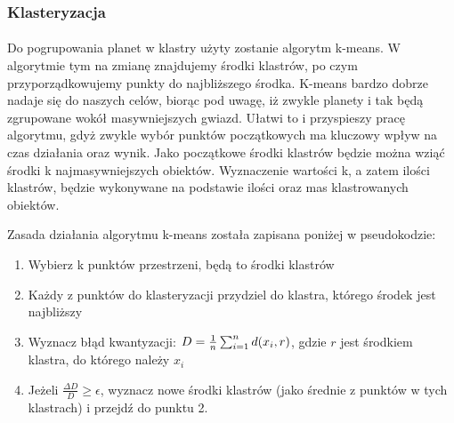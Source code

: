 \subsubsection{Klasteryzacja}

\paragraph{}

Do pogrupowania planet w klastry użyty zostanie algorytm k-means. W algorytmie tym na zmianę znajdujemy środki klastrów, po czym przyporządkowujemy punkty do najbliższego środka. K-means bardzo dobrze nadaje się do naszych celów, biorąc pod uwagę, iż zwykle planety i tak będą zgrupowane wokół masywniejszych gwiazd. Ułatwi to i przyspieszy pracę algorytmu, gdyż zwykle wybór punktów początkowych ma kluczowy wpływ na czas działania oraz wynik. Jako początkowe środki klastrów będzie można wziąć środki k najmasywniejszych obiektów. Wyznaczenie wartości k, a zatem ilości klastrów, będzie wykonywane na podstawie ilości oraz mas klastrowanych obiektów.

Zasada działania algorytmu k-means została zapisana poniżej w pseudokodzie:

\begin{enumerate}
	\item{Wybierz k punktów przestrzeni, będą to środki klastrów}
	\item{Każdy z punktów do klasteryzacji przydziel do klastra, którego środek jest najbliższy}
	\item{Wyznacz błąd kwantyzacji: \ensuremath{D = {1\over{n}}\sum_{i = 1}^{n}d(x_i, r)}, gdzie \ensuremath{r} jest środkiem klastra, do którego należy \ensuremath{x_i} }
	\item{Jeżeli \ensuremath{\frac{\Delta{D}}{D}\geqslant\epsilon}, wyznacz nowe środki klastrów (jako średnie z punktów w tych klastrach) i przejdź do punktu 2.}
\end{enumerate}
